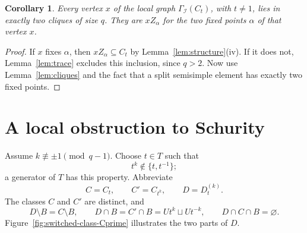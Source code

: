 \documentclass[11pt]{amsart}
\numberwithin{equation}{section}
\newtheorem{corollary}[theorem]{Corollary}
\theoremstyle{definition}
\theoremstyle{remark}
\newcommand{\I}{\mathcal I}
\begin{document}
\begin{corollary}\label{cor:two-original-cliques}
Every vertex $x$ of the local graph $\Gamma_{\I}(C_t)$, with $t\ne1$,
lies in exactly two cliques of size $q$. They are $xZ_\alpha$ for
the two fixed points $\alpha$ of that vertex $x$.
\end{corollary}
\begin{proof}
If $x$ fixes $\alpha$, then $xZ_\alpha\subseteq C_t$ by
Lemma~\ref{lem:structure}(iv). If it does not, Lemma~\ref{lem:trace}
excludes this inclusion, since $q>2$. Now use
Lemma~\ref{lem:cliques} and the fact that a split semisimple element
has exactly two fixed points.
\end{proof}

\section{A local obstruction to Schurity}

Assume $k\not\equiv\pm1\pmod{q-1}$. Choose $t\in T$ such that
\begin{equation}\label{eq:moved-t}
 t^k\notin\{t,t^{-1}\};
\end{equation}
a generator of $T$ has this property. Abbreviate
\[
 C=C_t,\qquad C'=C_{t^k},\qquad D=D_t^{(k)}.
\]
The classes $C$ and $C'$ are distinct, and
\begin{equation}\label{eq:D-pieces}
 D\setminus B=C\setminus B,\qquad
 D\cap B=C'\cap B=U{t^k}\sqcup U{t^{-k}},\qquad D\cap C\cap B=\varnothing.
\end{equation}
Figure~\ref{fig:switched-class-Cprime} illustrates the two parts of $D$.
\end{document}

